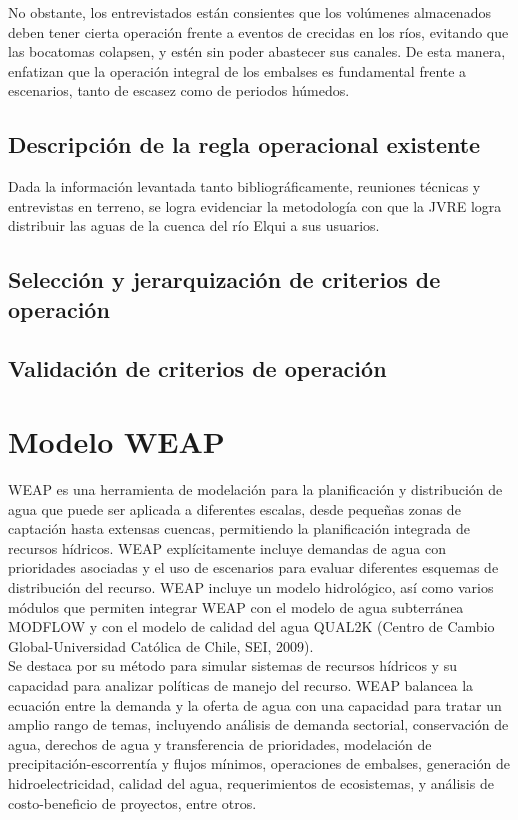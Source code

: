 \documentclass[11pt,]{article}
\begin{document}
 No obstante, los entrevistados están consientes que los volúmenes almacenados deben tener cierta operación frente a eventos de crecidas en los ríos, evitando que las bocatomas colapsen, y estén sin poder abastecer sus canales. De esta manera, enfatizan que la operación integral de los embalses es fundamental frente a escenarios, tanto de escasez como de periodos húmedos.
 
 
 
 
		
		\subsection{Descripción de la regla operacional existente}\bigskip
		
		Dada la información levantada tanto bibliográficamente, reuniones técnicas y entrevistas en terreno, se logra evidenciar la metodología con que la JVRE logra distribuir las aguas de la cuenca del río Elqui a sus usuarios. 
		
			\subsection{Selección y jerarquización de criterios de operación}\bigskip
			
			
			
			\subsection{Validación de criterios de operación}\bigskip

\section{Modelo WEAP}\bigskip

WEAP es una herramienta de modelación para la planificación y distribución de agua que puede ser aplicada a diferentes escalas, desde pequeñas zonas de captación hasta extensas cuencas, permitiendo la planificación integrada de recursos hídricos. WEAP explícitamente incluye demandas de agua con prioridades asociadas y el uso de escenarios para evaluar diferentes esquemas de distribución del recurso. WEAP incluye un modelo hidrológico, así como varios módulos que permiten integrar WEAP con el modelo de agua subterránea MODFLOW y con el modelo de calidad del agua QUAL2K (Centro de Cambio Global-Universidad Católica de Chile, SEI, 2009).\\

Se destaca por su método para simular sistemas de recursos hídricos y su capacidad para analizar políticas de manejo del recurso. WEAP balancea la ecuación entre la demanda y la oferta de agua con una capacidad para tratar un amplio rango de temas, incluyendo análisis de demanda sectorial, conservación de agua, derechos de agua y transferencia de prioridades, modelación de precipitación-escorrentía y flujos mínimos, operaciones de embalses, generación de hidroelectricidad, calidad del agua, requerimientos de ecosistemas, y análisis de costo-beneficio de proyectos, entre otros. \\
\end{document}
